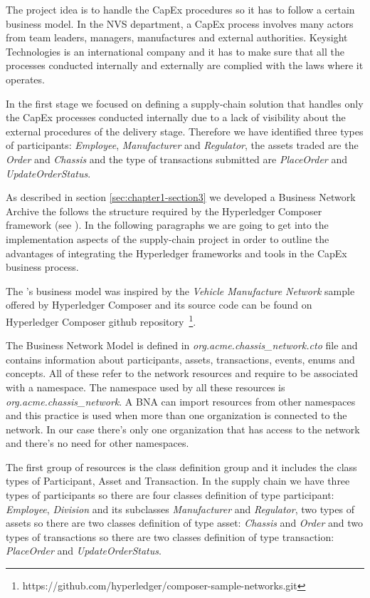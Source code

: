 The project idea is to handle the CapEx procedures so it has to follow a certain business model. In the NVS department, a CapEx process involves many actors from team leaders, managers, manufactures and external authorities. 
Keysight Technologies is an international company and it has to make sure that all the processes conducted internally and externally are complied with the laws where it operates.

In the first stage we focused on defining a supply-chain solution that handles only the CapEx processes conducted internally due to a lack of visibility about the external procedures of the delivery stage. 
Therefore we have identified three types of participants: \emph{Employee}, \emph{Manufacturer} and \emph{Regulator}, the assets traded are the \emph{Order} and \emph{Chassis} and the type of transactions submitted are \emph{PlaceOrder} and \emph{UpdateOrderStatus}.

As described in section \ref{sec:chapter1-section3} we developed a Business Network Archive the follows the structure required by the Hyperledger Composer framework (see ). In the following paragraphs we are going to get into the implementation aspects of the supply-chain project in order to outline the advantages of integrating the Hyperledger frameworks and tools in the CapEx business process. 

The {\project}'s business model was inspired by the \emph{Vehicle Manufacture Network} sample offered by Hyperledger Composer and its source code can be found on Hyperledger Composer github repository~\footnote{ https://github.com/hyperledger/composer-sample-networks.git}.


The Business Network Model is defined in \emph{org.acme.chassis_network.cto} file and contains information about participants, assets, transactions, events, enums and concepts. All of these refer to the network resources and require to be associated with a namespace. The namespace used by all these resources is \emph{org.acme.chassis_network}. A BNA can import resources from other namespaces and this practice is used when more than one organization is connected to the network. In our case there's only one organization that has access to the network and there's no need for other namespaces.

The first group of resources is the class definition group and it includes the class types of Participant, Asset and Transaction. In the supply chain we have three types of participants so there are four classes definition of type participant: \emph{Employee}, \emph{Division} and its subclasses \emph{Manufacturer} and \emph{Regulator}, two types of assets so there are two classes definition of type asset: \emph{Chassis} and \emph{Order} and two types of transactions so there are two classes definition of type transaction: \emph{PlaceOrder} and \emph{UpdateOrderStatus}. 


